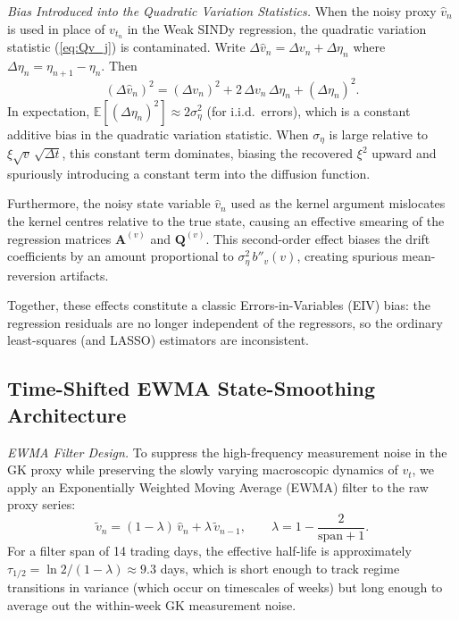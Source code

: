 \documentclass[reprint, amsmath, amssymb, aps, prl, superscriptaddress, nofootinbib]{revtex4-2}
\begin{document}
\textit{Bias Introduced into the Quadratic Variation Statistics.}
When the noisy proxy $\widehat{v}_n$ is used in place of $v_{t_n}$ in the Weak
SINDy regression, the quadratic variation statistic (\ref{eq:Qv_j}) is contaminated.
Write $\Delta\widehat{v}_n = \Delta v_n + \Delta\eta_n$ where $\Delta\eta_n
= \eta_{n+1} - \eta_n$. Then
\begin{equation}
  (\Delta\widehat{v}_n)^2 = (\Delta v_n)^2 + 2\,\Delta v_n\,\Delta\eta_n
    + (\Delta\eta_n)^2.
  \label{eq:eiv_expansion}
\end{equation}
In expectation, $\mathbb{E}[(\Delta\eta_n)^2] \approx 2\sigma_\eta^2$ (for
i.i.d.\ errors), which is a constant additive bias in the quadratic variation
statistic. When $\sigma_\eta$ is large relative to $\xi\sqrt{v}\,\sqrt{\Delta t}$,
this constant term dominates, biasing the recovered $\xi^2$ upward and
spuriously introducing a constant term into the diffusion function.

Furthermore, the noisy state variable $\widehat{v}_n$ used as the kernel argument
mislocates the kernel centres relative to the true state, causing an effective
smearing of the regression matrices $\mathbf{A}^{(v)}$ and $\mathbf{Q}^{(v)}$.
This second-order effect biases the drift coefficients by an amount proportional
to $\sigma_\eta^2\,b''_v(v)$, creating spurious mean-reversion artifacts.

Together, these effects constitute a classic Errors-in-Variables (EIV) bias: the
regression residuals are no longer independent of the regressors, so the ordinary
least-squares (and LASSO) estimators are inconsistent.

\subsection{Time-Shifted EWMA State-Smoothing Architecture}

\textit{EWMA Filter Design.}
To suppress the high-frequency measurement noise in the GK proxy while preserving
the slowly varying macroscopic dynamics of $v_t$, we apply an Exponentially Weighted
Moving Average (EWMA) filter to the raw proxy series:
\begin{equation}
  \widetilde{v}_n = (1-\lambda)\,\widehat{v}_n + \lambda\,\widetilde{v}_{n-1},
  \qquad \lambda = 1 - \frac{2}{\mathrm{span}+1}.
\end{equation}
For a filter span of 14 trading days, the effective half-life is approximately
$\tau_{1/2} = \ln 2 / (1-\lambda) \approx 9.3$ days, which is short enough to track
regime transitions in variance (which occur on timescales of weeks) but long enough
to average out the within-week GK measurement noise.
\end{document}
